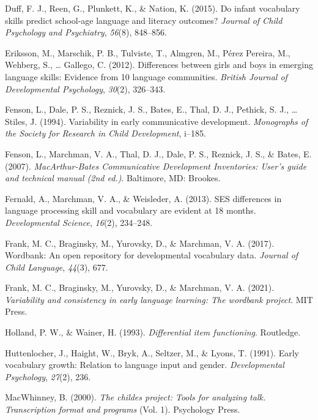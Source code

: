 \documentclass[10pt, letterpaper]{article}
\begin{document}
\leavevmode\hypertarget{ref-duff2015infant}{}%
Duff, F. J., Reen, G., Plunkett, K., \& Nation, K. (2015). Do infant
vocabulary skills predict school-age language and literacy outcomes?
\emph{Journal of Child Psychology and Psychiatry}, \emph{56}(8),
848--856.

\leavevmode\hypertarget{ref-eriksson2012differences}{}%
Eriksson, M., Marschik, P. B., Tulviste, T., Almgren, M., Pérez Pereira,
M., Wehberg, S., \ldots{} Gallego, C. (2012). Differences between girls
and boys in emerging language skills: Evidence from 10 language
communities. \emph{British Journal of Developmental Psychology},
\emph{30}(2), 326--343.

\leavevmode\hypertarget{ref-fenson1994}{}%
Fenson, L., Dale, P. S., Reznick, J. S., Bates, E., Thal, D. J.,
Pethick, S. J., \ldots{} Stiles, J. (1994). Variability in early
communicative development. \emph{Monographs of the Society for Research
in Child Development}, i--185.

\leavevmode\hypertarget{ref-Fenson2007}{}%
Fenson, L., Marchman, V. A., Thal, D. J., Dale, P. S., Reznick, J. S.,
\& Bates, E. (2007). \emph{MacArthur-Bates Communicative Development
Inventories: User's guide and technical manual (2nd ed.)}. Baltimore,
MD: Brookes.

\leavevmode\hypertarget{ref-fernald2013ses}{}%
Fernald, A., Marchman, V. A., \& Weisleder, A. (2013). SES differences
in language processing skill and vocabulary are evident at 18 months.
\emph{Developmental Science}, \emph{16}(2), 234--248.

\leavevmode\hypertarget{ref-frank2017}{}%
Frank, M. C., Braginsky, M., Yurovsky, D., \& Marchman, V. A. (2017).
Wordbank: An open repository for developmental vocabulary data.
\emph{Journal of Child Language}, \emph{44}(3), 677.

\leavevmode\hypertarget{ref-frank2021}{}%
Frank, M. C., Braginsky, M., Yurovsky, D., \& Marchman, V. A. (2021).
\emph{Variability and consistency in early language learning: The
wordbank project}. MIT Press.

\leavevmode\hypertarget{ref-holland1993differential}{}%
Holland, P. W., \& Wainer, H. (1993). \emph{Differential item
functioning}. Routledge.

\leavevmode\hypertarget{ref-huttenlocher1991early}{}%
Huttenlocher, J., Haight, W., Bryk, A., Seltzer, M., \& Lyons, T.
(1991). Early vocabulary growth: Relation to language input and gender.
\emph{Developmental Psychology}, \emph{27}(2), 236.

\leavevmode\hypertarget{ref-macwhinney2000childes}{}%
MacWhinney, B. (2000). \emph{The childes project: Tools for analyzing
talk. Transcription format and programs} (Vol. 1). Psychology Press.
\end{document}

